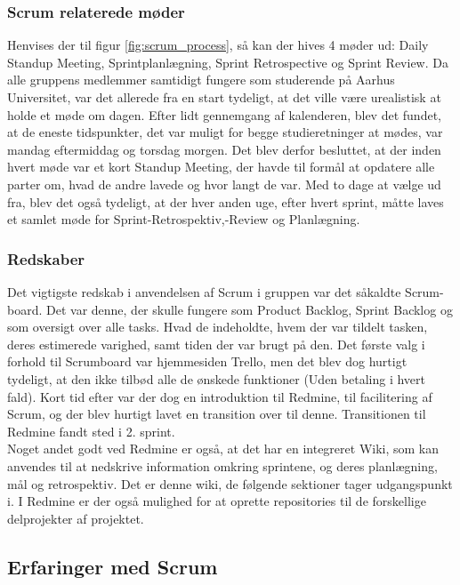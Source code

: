 \documentclass[a4paper,12pt,fleqn,oneside]{article}
\begin{document}
\subsubsection{Scrum relaterede møder}
Henvises der til figur \ref{fig:scrum_process}, så kan der hives 4 møder ud: Daily Standup Meeting, Sprintplanlægning, Sprint Retrospective og Sprint Review. Da alle gruppens medlemmer samtidigt fungere som studerende på Aarhus Universitet, var det allerede fra en start tydeligt, at det ville være urealistisk at holde et møde om dagen. Efter lidt gennemgang af kalenderen, blev det fundet, at de eneste tidspunkter, det var muligt for begge studieretninger at mødes, var mandag eftermiddag og torsdag morgen. Det blev derfor besluttet, at der inden hvert møde var et kort Standup Meeting, der havde til formål at opdatere alle parter om, hvad de andre lavede og hvor langt de var. Med to dage at vælge ud fra, blev det også tydeligt, at der hver anden uge, efter hvert sprint, måtte laves et samlet møde for Sprint-Retrospektiv,-Review og Planlægning. 

\subsubsection{Redskaber} \label{sec:scrum_tools}
Det vigtigste redskab i anvendelsen af Scrum i gruppen var det såkaldte Scrum-board. Det var denne, der skulle fungere som Product Backlog, Sprint Backlog og som oversigt over alle tasks. Hvad de indeholdte, hvem der var tildelt tasken, deres estimerede varighed, samt tiden der var brugt på den. Det første valg i forhold til Scrumboard var hjemmesiden Trello, men det blev dog hurtigt tydeligt, at den ikke tilbød alle de ønskede funktioner (Uden betaling i hvert fald). Kort tid efter var der dog en introduktion til Redmine, til facilitering af Scrum, og der blev hurtigt lavet en transition over til denne. Transitionen til Redmine fandt sted i 2. sprint. 
\\Noget andet godt ved Redmine er også, at det har en integreret Wiki, som kan anvendes til at nedskrive information omkring sprintene, og deres planlægning, mål og retrospektiv. Det er denne wiki, de følgende sektioner tager udgangspunkt i. I Redmine er der også mulighed for at oprette repositories til de forskellige delprojekter af projektet.

\subsection{Erfaringer med Scrum}\label{sec:experiences_w_scrum}
\end{document}
